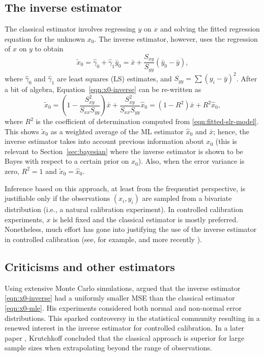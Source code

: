 \documentclass[cmfont,usenames,dvipsnames,leqno]{afit-etd}\usepackage[]{graphicx}\usepackage[]{color}
\newcommand{\wh}[1]{\ensuremath{\widehat{#1}}}
\newcommand{\wt}[1]{\ensuremath{\widetilde{#1}}}
\begin{document}
\subsection{The inverse estimator}
\label{sec:inverse-estimator}
The classical estimator involves regressing $y$ on $x$ and solving the fitted regression equation for the unknown $x_0$. The inverse estimator, however, uses the regression of $x$ on $y$ to obtain
\begin{equation}
\label{eqn:x0-inverse}
  \wt{x}_0 = \wh{\gamma}_0 + \wh{\gamma}_1 \bar{y}_0 = \bar{x} + \frac{S_{xy}}{S_{yy}}(\bar{y}_0 - \bar{y}),
\end{equation}
where $\wh{\gamma}_0$ and $\wh{\gamma}_1$ are least squares (LS) estimates, and $S_{yy} = \sum(y_i-\bar{y})^2$. After a bit of algebra, Equation~\eqref{eqn:x0-inverse} can be re-written as
\begin{equation}
\label{eqn:x0-inverse2}
  \wt{x}_0 = \left(1-\frac{S_{xy}^2}{S_{xx}S_{yy}}\right)\bar{x} + \frac{S_{xy}^2}{S_{xx}S_{yy}}\wh{x}_0 = \left(1-R^2\right)\bar{x} + R^2\wh{x}_0,
\end{equation}
where $R^2$ is the coefficient of determination computed from \eqref{eqn:fitted-slr-model}. This shows $\wt{x}_0$ as a weighted average of the \ac{ML} estimator $\wh{x}_0$ and $\bar{x}$; hence, the inverse estimator takes into account previous information about $x_0$ (this is relevant to Section~\ref{sec:bayesian} where the inverse estimator is shown to be Bayes with respect to a certain prior on $x_0$). Also, when the error variance is zero, $R^2 = 1$ and $\wt{x}_0 = \wh{x}_0$. 

Inference based on this approach, at least from the frequentist perspective, is justifiable only if the observations $(x_i, y_i)$ are sampled from a bivariate distribution (i.e., a natural calibration experiment). In controlled calibration experiments, $x$ is held fixed and the classical estimator is mostly preferred. Nonetheless, much effort has gone into justifying the use of the inverse estimator in controlled calibration (see, for example, \citet{krutchkoff_classical_1967} and more recently \citet{kannan_comparison_2007}).

\subsection{Criticisms and other estimators}
\label{sec:criticisms}
Using extensive Monte Carlo simulations, \citet{krutchkoff_classical_1967} argued that the inverse estimator \eqref{eqn:x0-inverse} had a uniformly smaller \ac{MSE} than the classical estimator \eqref{eqn:x0-mle}. His experiments considered both normal and non-normal error distributions. This sparked controversy in the statistical community resulting in a renewed interest in the inverse estimator for controlled calibration. In a later paper \citep{krutchkoff_classical_1969}, Krutchkoff concluded that the classical approach is superior for large sample sizes when extrapolating beyond the range of observations. 
\end{document}
